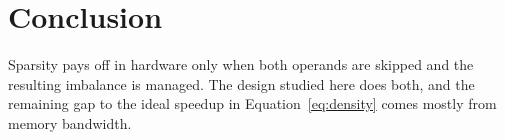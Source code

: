 \chapter{Conclusion}
\label{ch:conclusion}

Sparsity pays off in hardware only when both operands are skipped and the resulting imbalance
is managed. The design studied here does both, and the remaining gap to the ideal speedup in
Equation~\eqref{eq:density} comes mostly from memory bandwidth.
